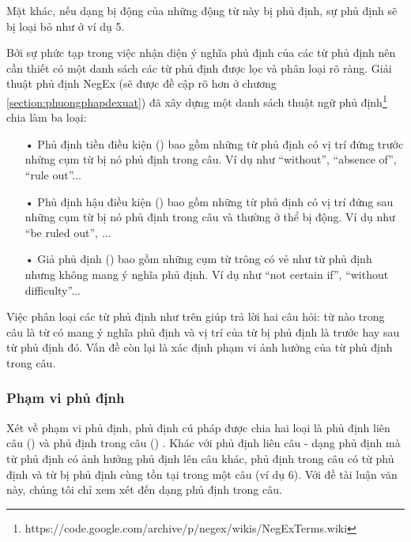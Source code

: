 
Mặt khác, nếu dạng bị động của những động từ này bị phủ định, sự phủ định sẽ bị loại bỏ như ở ví dụ 5.


Bởi sự phức tạp trong việc nhận diện ý nghĩa phủ định của các từ phủ định nên cần thiết có một danh sách các từ phủ định được lọc và phân loại rõ ràng. Giải thuật phủ định NegEx (sẽ được đề cập rõ hơn ở chương \ref{section:phuongphapdexuat}) đã xây dựng một danh sách thuật ngữ phủ định\footnote{https://code.google.com/archive/p/negex/wikis/NegExTerms.wiki} chia làm ba loại:

\begin{itemize}
\item[•] Phủ định tiền điều kiện () bao gồm những từ phủ định có vị trí đứng trước những cụm từ bị nó phủ định trong câu. Ví dụ như ``without'', ``absence of'', ``rule out''...
\item[•] Phủ định hậu điều kiện () bao gồm những từ phủ định có vị trí đứng sau những cụm từ bị nó phủ định trong câu và thường ở thể bị động. Ví dụ như ``be ruled out'', ...
\item[•] Giả phủ định () bao gồm những cụm từ trông có vẻ như từ phủ định nhưng không mang ý nghĩa phủ định. Ví dụ như ``not certain if'', ``without difficulty''...
\end{itemize}

Việc phân loại các từ phủ định như trên giúp trả lời hai câu hỏi: từ nào trong câu là từ có mang ý nghĩa phủ định và vị trí của từ bị phủ định là trước hay sau từ phủ định đó. Vấn đề còn lại là xác định phạm vi ảnh hưởng của từ phủ định trong câu.

\subsubsection*{Phạm vi phủ định}

Xét về phạm vi phủ định, phủ định cú pháp được chia hai loại là phủ định liên câu () và phủ định trong câu () \cite{Councill2010}. Khác với phủ định liên câu - dạng phủ định mà từ phủ định có ảnh hưởng phủ định lên câu khác, phủ định trong câu có từ phủ định và từ bị phủ định cùng tồn tại trong một câu (ví dụ 6). Với đề tài luận văn này, chúng tôi chỉ xem xét đến dạng phủ định trong câu.

